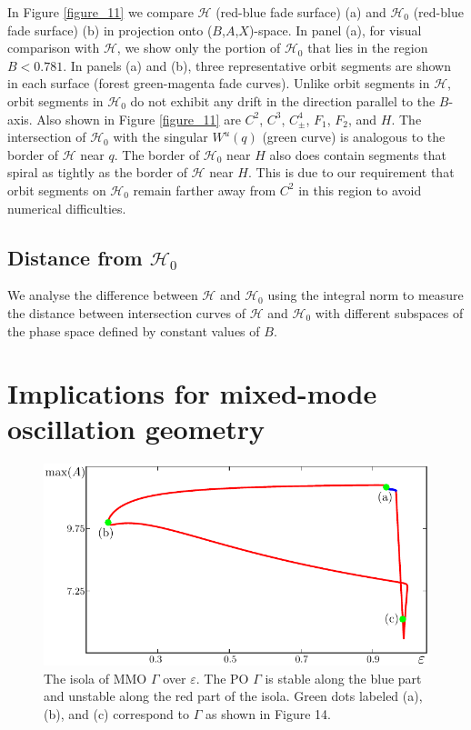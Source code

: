 \documentclass{ws-ijbc}
\begin{document}
In Figure \ref{figure_11} we compare $\mathscr{H}$ (red-blue fade surface) (a) and $\mathscr{H}_0$ (red-blue fade surface) (b) in projection onto ($B$,$A$,$X$)-space.  In panel (a), for visual comparison with $\mathscr{H}$, we show only the portion of $\mathscr{H}_0$ that lies in the region $B < 0.781$.  In panels (a) and (b), three representative orbit segments are shown in each surface (forest green-magenta fade curves).  Unlike orbit segments in $\mathscr{H}$, orbit segments in $\mathscr{H}_0$ do not exhibit any drift in the direction parallel to the $B$-axis.  Also shown in Figure \ref{figure_11} are  $C^2$, $C^3$, $C^4_\pm$, $F_1$, $F_2$, and $H$.  The intersection of $\mathscr{H}_0$ with the singular $W^u(q)$ (green curve) is analogous to the border of $\mathscr{H}$ near $q$.  The border of $\mathscr{H}_0$ near $H$ also does contain segments that spiral as tightly as the border of $\mathscr{H}$ near $H$.  This is due to our requirement that orbit segments on $\mathscr{H}_0$ remain farther away from $C^2$ in this region to avoid numerical difficulties.

\subsection{Distance from $\mathscr{H}_0$}

We analyse the difference between $\mathscr{H}$ and $\mathscr{H}_0$ using the integral norm to measure the distance between intersection curves of $\mathscr{H}$ and $\mathscr{H}_0$ with different subspaces of the phase space defined by constant values of $B$.


\section{Implications for mixed-mode oscillation geometry}


\begin{figure}[H]
\centering
\includegraphics[]{./figures/MKMO_12.pdf}
\caption{The isola of MMO $\Gamma$ over $\varepsilon$.  The PO $\Gamma$ is stable along the blue part and unstable along the red part of the isola.  Green dots labeled (a), (b), and (c) correspond to $\Gamma$ as shown in Figure 14.}
\label{figure_12}
\end{figure}
\end{document}
